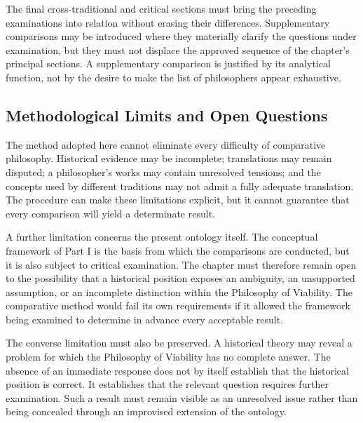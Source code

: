\label{para:VS.B01.P01.C08.S01.SS09.P006}
The final cross-traditional and critical sections
must bring the preceding examinations into relation
without erasing their differences. Supplementary
comparisons may be introduced where they materially
clarify the questions under examination, but they
must not displace the approved sequence of the
chapter's principal sections. A supplementary
comparison is justified by its analytical function,
not by the desire to make the list of philosophers
appear exhaustive.

\subsection{Methodological Limits and Open Questions}
\label{sec:ch08-s01-ss10}

\label{para:VS.B01.P01.C08.S01.SS10.P001}
The method adopted here cannot eliminate every
difficulty of comparative philosophy. Historical
evidence may be incomplete; translations may remain
disputed; a philosopher's works may contain
unresolved tensions; and the concepts used by
different traditions may not admit a fully adequate
translation. The procedure can make these
limitations explicit, but it cannot guarantee that
every comparison will yield a determinate result.

\label{para:VS.B01.P01.C08.S01.SS10.P002}
A further limitation concerns the present ontology
itself. The conceptual framework of Part I is the
basis from which the comparisons are conducted, but
it is also subject to critical examination. The
chapter must therefore remain open to the possibility
that a historical position exposes an ambiguity,
an unsupported assumption, or an incomplete
distinction within the Philosophy of Viability.
The comparative method would fail its own
requirements if it allowed the framework being
examined to determine in advance every acceptable
result.

\label{para:VS.B01.P01.C08.S01.SS10.P003}
The converse limitation must also be preserved.
A historical theory may reveal a problem for which
the Philosophy of Viability has no complete answer.
The absence of an immediate response does not by
itself establish that the historical position is
correct. It establishes that the relevant question
requires further examination. Such a result must
remain visible as an unresolved issue rather than
being concealed through an improvised extension
of the ontology.


